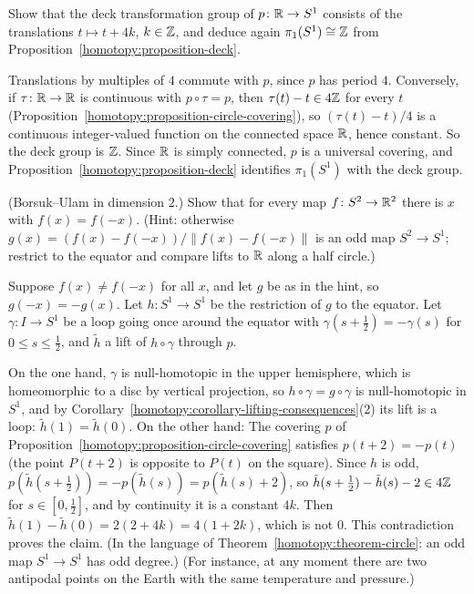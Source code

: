 \begin{exercise}\label{homotopy:exercise-deck-circle}
Show that the deck transformation group of $p \colon \mathbb{R} \to S^1$ consists of the translations $t \mapsto t + 4k$, $k \in \mathbb{Z}$, and deduce again
$\pi_1(S^1) \cong \mathbb{Z}$ from Proposition~\ref{homotopy:proposition-deck}.
\end{exercise}

\begin{solution}
Translations by multiples of $4$ commute with $p$, since $p$ has period $4$. Conversely, if $\tau \colon \mathbb{R} \to \mathbb{R}$ is continuous with $p \circ \tau = p$, then $\tau(t) - t \in 4\mathbb{Z}$ for every $t$
(Proposition~\ref{homotopy:proposition-circle-covering}), so $(\tau(t) - t)/4$ is a continuous integer-valued function on the connected space $\mathbb{R}$, hence constant. So the deck group is $\mathbb{Z}$. Since $\mathbb{R}$ is
simply connected, $p$ is a universal covering, and Proposition~\ref{homotopy:proposition-deck} identifies $\pi_1(S^1)$ with the deck group.
\end{solution}

\begin{exercise}\label{homotopy:exercise-borsuk-ulam}
(Borsuk--Ulam in dimension $2$.) Show that for every map $f \colon S^2 \to \mathbb{R}^2$ there is $x$ with $f(x) = f(-x)$. (Hint: otherwise
$g(x) = (f(x) - f(-x))/\|f(x) - f(-x)\|$ is an odd map $S^2 \to S^1$; restrict to the equator and compare lifts to $\mathbb{R}$ along a half circle.)
\end{exercise}

\begin{solution}
Suppose $f(x) \neq f(-x)$ for all $x$, and let $g$ be as in the hint, so $g(-x) = -g(x)$. Let $h \colon S^1 \to S^1$ be the restriction of $g$ to the equator. Let $\gamma \colon I \to S^1$ be a loop going once around the equator
with $\gamma(s + \frac12) = -\gamma(s)$ for $0 \leq s \leq \frac12$, and $\tilde h$ a lift of $h \circ \gamma$ through $p$.

On the one hand, $\gamma$ is null-homotopic in the upper hemisphere, which is homeomorphic to a disc by vertical projection, so $h \circ \gamma = g \circ \gamma$ is null-homotopic in $S^1$, and by
Corollary~\ref{homotopy:corollary-lifting-consequences}(2) its lift is a loop: $\tilde h(1) = \tilde h(0)$. On the other hand: The covering $p$ of Proposition~\ref{homotopy:proposition-circle-covering} satisfies
$p(t + 2) = -p(t)$ (the point $P(t + 2)$ is opposite to $P(t)$ on the square). Since $h$ is odd, $p(\tilde h(s + \frac12)) = -p(\tilde h(s)) = p(\tilde h(s) + 2)$, so
$\tilde h(s + \frac12) - \tilde h(s) - 2 \in 4\mathbb{Z}$ for $s \in [0, \frac12]$, and by continuity it is a constant $4k$. Then $\tilde h(1) - \tilde h(0) = 2(2 + 4k) = 4(1 + 2k)$, which is not $0$. This contradiction proves the claim. (In the
language of Theorem~\ref{homotopy:theorem-circle}: an odd map $S^1 \to S^1$ has odd degree.) (For instance, at any moment there are
two antipodal points on the Earth with the same temperature and pressure.)
\end{solution}

